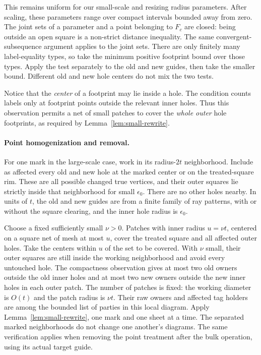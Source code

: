 This remains uniform for our small-scale and resizing radius
parameters.  After scaling, these parameters range over compact
intervals bounded away from zero.  The joint sets of a parameter and
a point belonging to $F_c$ are closed: being outside an open square
is a non-strict distance inequality.  The same convergent-subsequence
argument applies to the joint sets.  There are only finitely many
label-equality types, so take the minimum positive footprint bound
over those types.  Apply the test separately to the old and new
guides, then take the smaller bound.  Different old and new hole
centers do not mix the two tests.

Notice that the \emph{center} of a footprint may lie inside a hole.
The condition counts labels only at footprint points outside the
relevant inner holes.  Thus this observation permits a net of small
patches to cover the \emph{whole outer} hole footprints, as required
by Lemma~\ref{lem:small-rewrite}.

\paragraph{Point homogenization and removal.}
For one mark in the large-scale case, work in its radius-$2t$
neighborhood.  Include as affected every old and new hole at the
marked center or on the treated-square rim.  These are all possible
changed true vertices, and their outer squares lie strictly inside
that neighborhood for small $\epsilon_0$.  There are no other holes
nearby.  In units of $t$, the old and new guides are from a finite
family of ray patterns, with or without the square clearing, and the
inner hole radius is $\epsilon_0$.

Choose a fixed sufficiently small $\nu>0$.  Patches with inner radius
$u=\nu t$, centered on a square net of mesh at most $u$, cover the
treated square and all affected outer holes.  Take the centers within
$u$ of the set to be covered.  With $\nu$ small, their outer squares
are still inside the working neighborhood and avoid every untouched
hole.  The compactness observation gives at most two old owners
outside the old inner holes and at most two new owners outside the
new inner holes in each outer patch.  The number of patches is fixed:
the working diameter is $O(t)$ and the patch radius is $\nu t$.
Their raw owners and affected tag holders are among the bounded list
of parties in this local diagram.  Apply
Lemma~\ref{lem:small-rewrite}, one mark and one sheet at a time.
The separated marked neighborhoods do not change one another's
diagrams.  The same verification applies when removing the point
treatment after the bulk operation, using its actual target guide.

